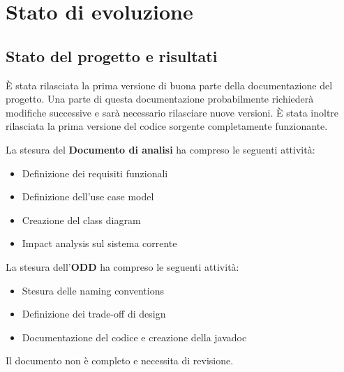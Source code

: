 \chapter{Stato di evoluzione}
\section{Stato del progetto e risultati}
È stata rilasciata la prima versione di buona parte della documentazione del progetto. Una parte di questa documentazione probabilmente richiederà modifiche successive e sarà necessario rilasciare nuove versioni. È stata inoltre rilasciata la prima versione del codice sorgente completamente funzionante.

\vspace{0.5cm}
{\setlength{\parindent}{0cm}
La stesura del \textbf{Documento di analisi} ha compreso le seguenti attività:
\begin{itemize}
 \item Definizione dei requisiti funzionali
 \item Definizione dell'use case model
 \item Creazione del class diagram
 \item Impact analysis sul sistema corrente
\end{itemize}
}

\vspace{0.5cm}

{\setlength{\parindent}{0cm}
La stesura dell'\textbf{ODD} ha compreso le seguenti attività:
\begin{itemize}
 \item Stesura delle naming conventions
 \item Definizione dei trade-off di design
 \item Documentazione del codice e creazione della javadoc
\end{itemize}
Il documento non è completo e necessita di revisione.
}

\vspace{0.5cm}

